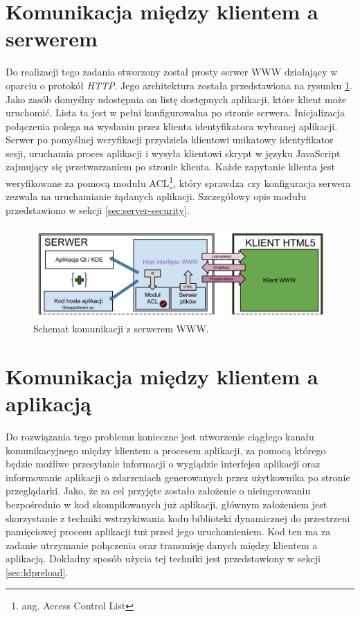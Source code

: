 \section{Komunikacja między klientem a serwerem}

Do realizacji tego zadania stworzony został prosty serwer WWW działający w oparciu o protokół \emph{HTTP}. Jego architektura została przedstawiona na rysunku \ref{fig:arch-www}. Jako zasób domyślny udostępnia on listę dostępnych aplikacji, które klient może uruchomić. Lista ta jest w pełni konfigurowalna po stronie serwera. Inicjalizacja połączenia polega na wysłaniu przez klienta identyfikatora wybranej aplikacji. Serwer po pomyślnej weryfikacji przydziela klientowi unikatowy identyfikator sesji, uruchamia proces aplikacji i wysyła klientowi skrypt w języku JavaScript zajmujący się przetwarzaniem po stronie klienta. Każde zapytanie klienta jest weryfikowane za pomocą modułu ACL\footnote{ang. Access Control List}, który sprawdza czy konfiguracja serwera zezwala na uruchamianie żądanych aplikacji. Szczegółowy opis modułu przedstawiono w sekcji \ref{sec:server-security}.

\begin{figure}[H]
\centering
\includegraphics[width=1.0\linewidth]{img/arch-www}
\caption{Schemat komunikacji z serwerem WWW.}
\label{fig:arch-www}
\end{figure}

\section{Komunikacja między klientem a aplikacją}

Do rozwiązania tego problemu konieczne jest utworzenie ciągłego kanału komunikacyjnego między klientem a procesem aplikacji, za pomocą którego będzie możliwe przesyłanie informacji o wyglądzie interfejsu aplikacji oraz informowanie aplikacji o zdarzeniach generowanych przez użytkownika po stronie przeglądarki. Jako, że za cel przyjęte zostało założenie o nieingerowaniu bezpośrednio w kod skompilowanych już aplikacji, głównym założeniem jest skorzystanie z techniki wstrzykiwania kodu biblioteki dynamicznej do przestrzeni pamięciowej procesu aplikacji tuż przed jego uruchomieniem. Kod ten ma za zadanie utrzymanie połączenia oraz transmisję danych między klientem a aplikacją. Dokładny sposób użycia tej techniki jest przedstawiony w sekcji \ref{sec:ldpreload}.

